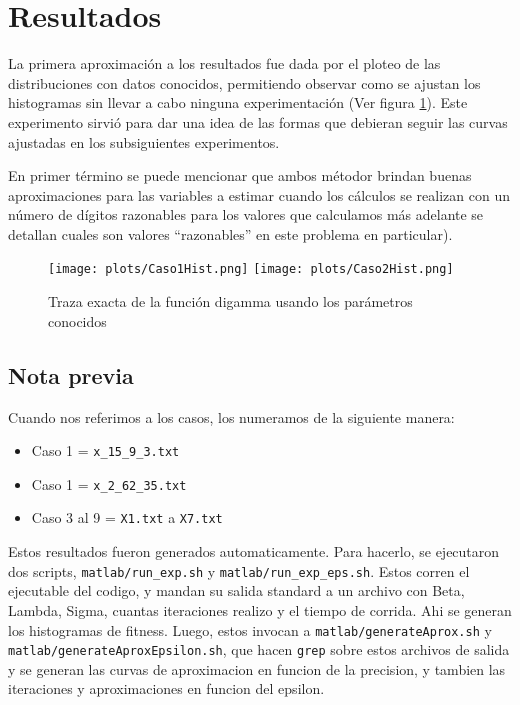 \section{Resultados}

La primera aproximaci\'on a los resultados fue dada por el ploteo de las 
distribuciones con datos conocidos, permitiendo observar como se ajustan los 
histogramas sin llevar a cabo ninguna experimentaci\'on (Ver figura \ref{fig:Exacto1y2}). 
Este experimento sirvi\'o para dar una idea de las formas que debieran seguir 
las curvas ajustadas en los subsiguientes experimentos.

En primer t\'ermino se puede mencionar que ambos m\'etodor brindan buenas
aproximaciones para las variables a estimar cuando los c\'alculos se realizan
con un n\'umero de d\'igitos razonables para los valores que calculamos m\'as
adelante se detallan cuales son valores ``razonables'' en este problema en
particular).
\begin{figure} [H]
\begin {center}
\texttt{[image: plots/Caso1Hist.png]}
\texttt{[image: plots/Caso2Hist.png]}
\end {center}
\caption{Traza exacta de la funci\'on digamma usando los par\'ametros conocidos}
\label{fig:Exacto1y2}
\end{figure}

\subsection{Nota previa}
Cuando nos referimos a los casos, los numeramos de la siguiente manera:\\
\begin{itemize}
    \item Caso 1 = \texttt{x\_15\_9\_3.txt}
    \item Caso 1 = \texttt{x\_2\_62\_35.txt}
    \item Caso 3 al 9 = \texttt{X1.txt} a \texttt{X7.txt}
\end{itemize}

Estos resultados fueron generados automaticamente. Para hacerlo, se ejecutaron
dos scripts, \texttt{matlab/run\_exp.sh} y \texttt{matlab/run\_exp\_eps.sh}.
Estos corren el ejecutable del codigo, y mandan su salida standard a un archivo
con Beta, Lambda, Sigma, cuantas iteraciones realizo y el tiempo de corrida. Ahi se generan
los histogramas de fitness. Luego, estos invocan a \texttt{matlab/generateAprox.sh} y 
\texttt{matlab/generateAproxEpsilon.sh}, que hacen \texttt{grep} sobre estos archivos de
salida y se generan las curvas de aproximacion en funcion de la precision, y tambien
las iteraciones y aproximaciones en funcion del epsilon. \\

